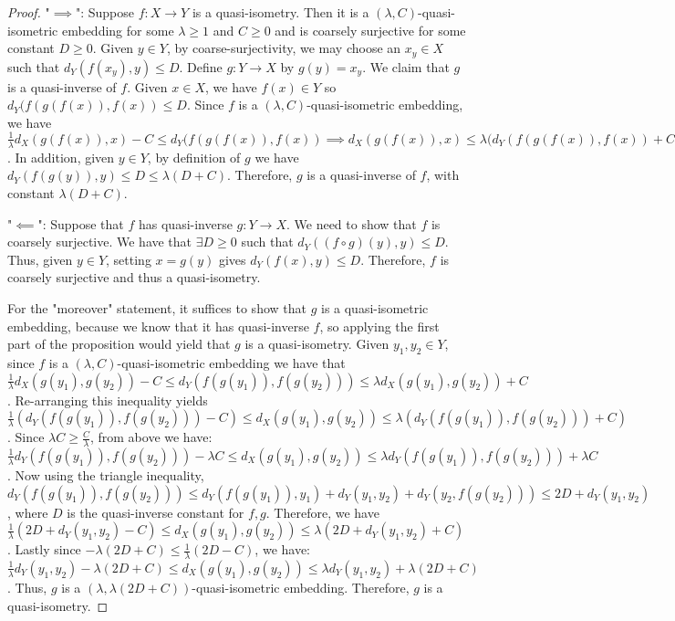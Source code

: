 \documentclass[12pt]{article}
\newcommand{\vs}{\vskip10pt}
\begin{document}
 	\begin{proof}
 		
 		"$\implies$": Suppose $f: X \rightarrow Y$ is a quasi-isometry. Then it is a $(\lambda, C)$-quasi-isometric embedding for some $\lambda \geq 1$ and $C \geq 0$ and is coarsely surjective for some constant $D \geq 0$. Given $y \in Y$, by coarse-surjectivity, we may choose an $x_y \in X$ such that $d_Y(f(x_y), y) \leq D$. Define $g: Y \rightarrow X$ by $g(y) = x_y$. We claim that $g$ is a quasi-inverse of $f$. Given $x \in X$, we have $f(x) \in Y$ so $d_Y(f(g(f(x)), f(x)) \leq D$. Since $f$ is a $(\lambda, C)$-quasi-isometric embedding, we have $\frac{1}{\lambda}d_X(g(f(x)), x) - C \leq d_Y(f(g(f(x)), f(x)) \implies d_X(g(f(x)), x) \leq \lambda(d_Y(f(g(f(x)), f(x)) + C) \leq \lambda(D + C)$. In addition, given $y \in Y$, by definition of $g$ we have $d_Y(f(g(y)), y) \leq D \leq \lambda(D + C)$. Therefore, $g$ is a quasi-inverse of $f$, with constant $\lambda(D + C)$. 
 		
 		\vs 
 		
 		"$\impliedby$": Suppose that $f$ has quasi-inverse $g: Y \rightarrow X$. We need to show that $f$ is coarsely surjective. We have that $\exists D \geq 0$ such that $d_Y((f \circ g)(y), y) \leq D$. Thus, given $y \in Y$, setting $x = g(y)$ gives $d_Y(f(x), y) \leq D$. Therefore, $f$ is coarsely surjective and thus a quasi-isometry. 
 		
 		\vs 
 		
 		For the "moreover" statement, it suffices to show that $g$ is a quasi-isometric embedding, because we know that it has quasi-inverse $f$, so applying the first part of the proposition would yield that $g$ is a quasi-isometry. 
 		\vs
 		Given $y_1, y_2 \in Y$, since $f$ is a $(\lambda, C)$-quasi-isometric embedding we have that $\frac{1}{\lambda} d_X(g(y_1), g(y_2)) - C \leq d_Y(f(g(y_1)), f(g(y_2))) \leq \lambda d_X(g(y_1), g(y_2)) + C$. Re-arranging this inequality yields $\frac{1}{\lambda} (d_Y(f(g(y_1)), f(g(y_2))) - C) \leq d_X(g(y_1), g(y_2)) \leq \lambda (d_Y(f(g(y_1)), f(g(y_2))) + C) $. Since $\lambda C \geq \frac{C}{\lambda}$, from above we have: $\frac{1}{\lambda} d_Y(f(g(y_1)), f(g(y_2))) - \lambda C \leq d_X(g(y_1), g(y_2)) \leq \lambda d_Y(f(g(y_1)), f(g(y_2))) + \lambda C$. Now using the triangle inequality, $d_Y(f(g(y_1)), f(g(y_2))) \leq d_Y(f(g(y_1)), y_1) + d_Y(y_1, y_2) + d_Y(y_2, f(g(y_2))) \leq 2D + d_Y(y_1,y_2)$, where $D$ is the quasi-inverse constant for $f,g$. Therefore, we have $\frac{1}{\lambda} (2D + d_Y(y_1, y_2) - C) \leq  d_X(g(y_1), g(y_2)) \leq \lambda (2D + d_Y(y_1, y_2) + C)$. Lastly since $-\lambda(2D + C) \leq \frac{1}{\lambda} (2D - C)$, we have: $\frac{1}{\lambda} d_Y(y_1, y_2) - \lambda (2D + C) \leq d_X(g(y_1), g(y_2)) \leq \lambda d_Y(y_1, y_2) + \lambda(2D + C)$. Thus, $g$ is a $(\lambda, \lambda(2D + C))$-quasi-isometric embedding. Therefore, $g$ is a quasi-isometry. 
 		
 	\end{proof}
 
\end{document}
